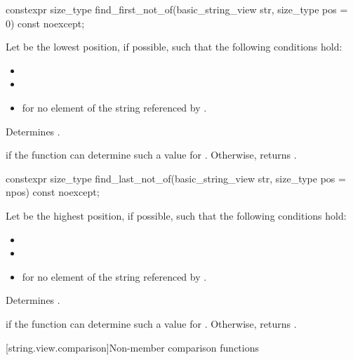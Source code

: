 %
\begin{itemdecl}
constexpr size_type find_first_not_of(basic_string_view str, size_type pos = 0) const noexcept;
\end{itemdecl}

\begin{itemdescr}
\pnum
Let  be the lowest position, if possible, such that the following conditions hold:
\begin{itemize}
\item
{}
\item
{}
\item
{} for no element  of the string referenced by .
\end{itemize}

\pnum
\effects
Determines .

\pnum
\returns
{} if the function can determine such a value for . Otherwise, returns .
\end{itemdescr}

%
\begin{itemdecl}
constexpr size_type find_last_not_of(basic_string_view str, size_type pos = npos) const noexcept;
\end{itemdecl}

\begin{itemdescr}
\pnum
Let  be the highest position, if possible, such that the following conditions hold:
\begin{itemize}
\item
{}
\item
{}
\item
{} for no element  of the string referenced by .
\end{itemize}

\pnum
\effects
Determines .

\pnum
\returns
{} if the function can determine such a value for .
Otherwise, returns .
\end{itemdescr}

[string.view.comparison]{Non-member comparison functions}

